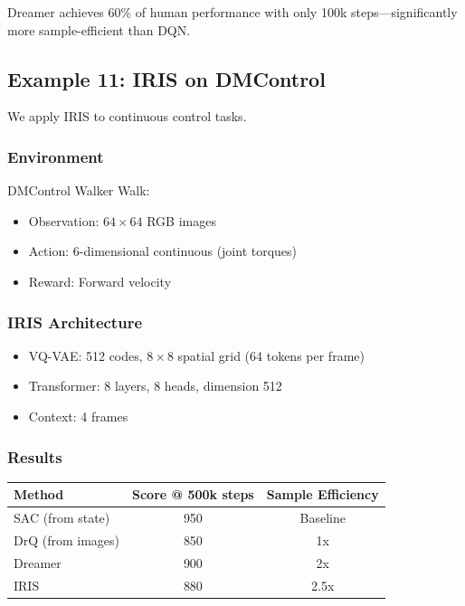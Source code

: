 Dreamer achieves 60\% of human performance with only 100k steps---significantly more sample-efficient than DQN.

\subsection{Example 11: IRIS on DMControl}

We apply IRIS to continuous control tasks.

\subsubsection{Environment}

DMControl Walker Walk:
\begin{itemize}
    \item Observation: $64 \times 64$ RGB images
    \item Action: 6-dimensional continuous (joint torques)
    \item Reward: Forward velocity
\end{itemize}

\subsubsection{IRIS Architecture}

\begin{itemize}
    \item VQ-VAE: 512 codes, $8 \times 8$ spatial grid (64 tokens per frame)
    \item Transformer: 8 layers, 8 heads, dimension 512
    \item Context: 4 frames
\end{itemize}

\subsubsection{Results}

\begin{center}
\begin{tabular}{lcc}
\toprule
\textbf{Method} & \textbf{Score @ 500k steps} & \textbf{Sample Efficiency} \\
\midrule
SAC (from state) & 950 & Baseline \\
DrQ (from images) & 850 & 1x \\
Dreamer & 900 & 2x \\
IRIS & 880 & 2.5x \\
\bottomrule
\end{tabular}
\end{center}

